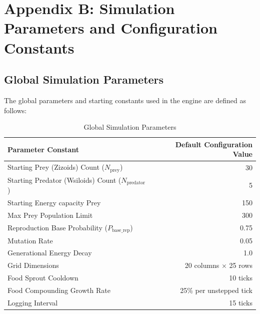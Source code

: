 \documentclass[11pt,a4paper]{article}
\begin{document}
\section{Appendix B: Simulation Parameters and Configuration Constants}

\subsection{Global Simulation Parameters}
\label{sec:ann_params}
The global parameters and starting constants used in the engine are defined as follows:
\begin{table}[h]
\centering
\caption{Global Simulation Parameters}
\begin{tabular}{lr}
\toprule
\textbf{Parameter Constant} & \textbf{Default Configuration Value} \\
\midrule
Starting Prey (Zizoids) Count ($N_{\text{prey}}$) & 30 \\
Starting Predator (Wsiloids) Count ($N_{\text{predator}}$) & 5 \\
Starting Energy capacity Prey & 150 \\
Max Prey Population Limit & 300 \\
Reproduction Base Probability ($P_{\text{base\_rep}}$) & 0.75 \\
Mutation Rate & 0.05 \\
Generational Energy Decay & 1.0 \\
Grid Dimensions & 20 columns $\times$ 25 rows \\
Food Sprout Cooldown & 10 ticks \\
Food Compounding Growth Rate & 25\% per unstepped tick \\
Logging Interval & 15 ticks \\
\bottomrule
\end{tabular}
\end{table}
\end{document}
